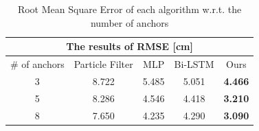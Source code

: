 \documentclass[letterpaper, 10 pt, conference]{ieeeconf}  %
\begin{document}
\begin{table}[h]
	\centering
	\caption{Root Mean Square Error of each algorithm w.r.t. the number of anchors}
	\begin{tabular}{ccccc}
		\hline
		\multicolumn{5}{c}{The results of RMSE {[}cm{]}}   \\ \hline
		\# of anchors & Particle Filter\cite{gonzalez2009mobile} & MLP\cite{kumar2016localization} & Bi-LSTM\cite{lim2018effective} & Ours \\ \cline{2-5} 
		3             & 8.722 & 5.485 & 5.051 & \textbf{4.466} \\
		5             & 8.286 & 4.546 & 4.418 & \textbf{3.210} \\
		8             & 7.650 & 4.235 & 4.290 & \textbf{3.090} \\ \hline
	\end{tabular}
	\label{table:rmse}
\end{table}
\end{document}
